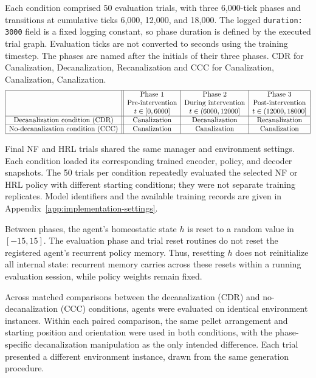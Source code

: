 \documentclass[12pt,fleqn]{article}
\begin{document}
Each condition comprised 50 evaluation trials, with three 6,000-tick phases and transitions at cumulative ticks 6,000, 12,000, and 18,000. The logged \texttt{duration: 3000} field is a fixed logging constant, so phase duration is defined by the executed trial graph. Evaluation ticks are not converted to seconds using the training timestep. The phases are named after the initials of their three phases. CDR for Canalization, Decanalization, Recanalization and CCC for Canalization, Canalization, Canalization.
{\scriptsize
\[
  \begin{array}{|c||c|c|c|}
    \hline
     & \text{Phase 1}        & \text{Phase 2}   & \text{Phase 3}    \\
     & \text{Pre-intervention} & \text{During intervention} & \text{Post-intervention} \\
     & t\in[0,6000]          & t\in(6000,12000] & t\in(12000,18000] \\
    \hline
    \text{Decanalization condition (CDR)}
     & \text{Canalization}
     & \text{Decanalization}
     & \text{Recanalization}                                        \\
    \hline
    \text{No-decanalization condition (CCC)}
     & \text{Canalization}
     & \text{Canalization}
     & \text{Canalization}                                          \\
    \hline
  \end{array}
\]
}

Final NF and HRL trials shared the same manager and environment settings. Each condition loaded its corresponding trained encoder, policy, and decoder snapshots. The 50 trials per condition repeatedly evaluated the selected NF or HRL policy with different starting conditions; they were not separate training replicates. Model identifiers and the available training records are given in Appendix~\ref{app:implementation-settings}.

Between phases, the agent's homeostatic state \(h\) is reset to a random value in \([-15,15]\). The evaluation phase and trial reset routines do not reset the registered agent's recurrent policy memory. Thus, resetting \(h\) does not reinitialize all internal state: recurrent memory carries across these resets within a running evaluation session, while policy weights remain fixed.

Across matched comparisons between the decanalization (CDR) and no-decanalization (CCC) conditions, agents were evaluated on identical environment instances. Within each paired comparison, the same pellet arrangement and starting position and orientation were used in both conditions, with the phase-specific decanalization manipulation as the only intended difference. Each trial presented a different environment instance, drawn from the same generation procedure.
\end{document}

